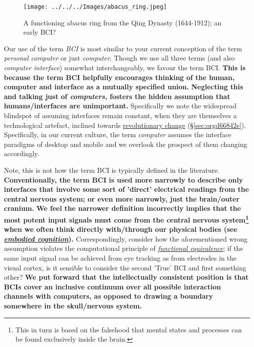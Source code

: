 \documentclass[logo,bsc,singlespacing,parskip]{infthesis}
\begin{document}
\begin{wrapfigure}{r}{0.55\textwidth}
\centering
\texttt{[image: ../../../Images/abacus\_ring.jpeg]}
\caption[Abacus ring; an early BCI]{A functioning abacus ring from the Qing Dynasty (1644-1912); an early BCI?}
\end{wrapfigure}

Our use of the term \emph{BCI} is most similar to your current conception of the term \emph{personal computer} or just \emph{computer}.
Though we use all three terms (and also \emph{computer interface}) somewhat interchangeably, we favour the term BCI.
\textbf{This is because the term BCI helpfully encourages thinking of the human, computer and interface as a mutually specified union.}
\textbf{Neglecting this and talking just of \emph{computers}, fosters the hidden assumption that humans/interfaces are unimportant.}
Specifically we note the widespread blindspot of assuming interfaces remain constant, when they are themselves a technological artefact, inclined towards \hyperref[sec:orgd66842e]{revolutionary change} (\S \ref{sec:orgd66842e}).
Specifically, in our current culture, the term \emph{computer} assumes the interface paradigms of desktop and mobile and we overlook the prospect of them changing accordingly.

Note, this is not how the term BCI is typically defined in the literature.
\textbf{Conventionally, the term BCI is used more narrowly to describe only interfaces that involve some sort of 'direct' electrical readings from the central nervous system; or even more narrowly, just the brain/outer cranium.}
\textbf{We feel the narrower definition incorrectly implies that the most potent input signals must come from the central nervous system\footnote{This in turn is based on the falsehood that mental states and processes can be found exclusively inside the brain.} when we often think directly with/through our physical bodies (see \emph{\hyperref[orgef09c3f]{embodied cognition}}).}
Correspondingly, consider how the aforementioned wrong assumption violates the computational principle of \emph{\hyperref[org1ce07fc]{functional equivalence}}; if the same input signal can be achieved from eye tracking as from electrodes in the visual cortex, is it sensible to consider the second 'True' BCI and first something other?
\textbf{We put forward that the intellectually consistent position is that BCIs cover an inclusive continuum over all possible interaction channels with computers, as opposed to drawing a boundary somewhere in the skull/nervous system.}
\end{document}
